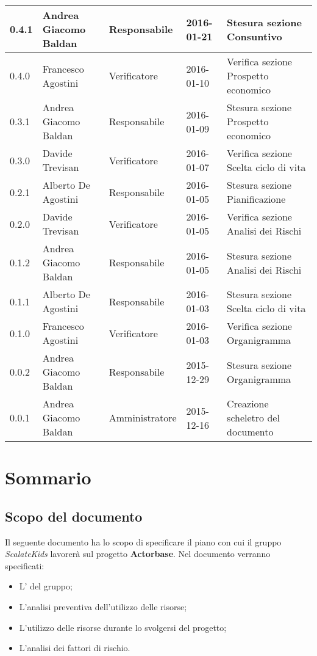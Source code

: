 \documentclass{scalatekids-article}
\begin{document}
\begin{center}
\begin{longtable}{| l | l | l | l | p{5cm} |}
    \hline
    0.4.1 & Andrea Giacomo Baldan & Responsabile & 2016-01-21 & Stesura sezione Consuntivo\\
    \hline
    0.4.0 & Francesco Agostini & Verificatore & 2016-01-10 & Verifica sezione Prospetto economico\\
    \hline
    0.3.1 & Andrea Giacomo Baldan & Responsabile & 2016-01-09 & Stesura sezione Prospetto economico\\
    \hline
    0.3.0 & Davide Trevisan & Verificatore & 2016-01-07 & Verifica sezione Scelta ciclo di vita\\
    \hline
    0.2.1 & Alberto De Agostini & Responsabile & 2016-01-05 & Stesura sezione Pianificazione\\
    \hline
    0.2.0 & Davide Trevisan & Verificatore & 2016-01-05 & Verifica sezione Analisi dei Rischi\\
    \hline
    0.1.2 & Andrea Giacomo Baldan & Responsabile & 2016-01-05 & Stesura sezione Analisi dei Rischi\\
    \hline
    0.1.1 & Alberto De Agostini & Responsabile & 2016-01-03 & Stesura sezione Scelta ciclo di vita\\
    \hline
    0.1.0 & Francesco Agostini & Verificatore & 2016-01-03 & Verifica sezione Organigramma\\
    \hline
    0.0.2 & Andrea Giacomo Baldan & Responsabile & 2015-12-29 & Stesura sezione Organigramma\\
    \hline
    0.0.1 & Andrea Giacomo Baldan & Amministratore & 2015-12-16 & Creazione scheletro del documento\\
    \hline
  \end{longtable}
\end{center}
\tableofcontents
\newpage
{}
\section{Sommario}
\subsection{Scopo del documento}
Il seguente documento ha lo scopo di specificare il piano con cui il gruppo \textit{ScalateKids} lavorerà sul progetto \textbf{Actorbase}.
Nel documento verranno specificati:
\begin{itemize}
\item {L' del gruppo;}
\item {L'analisi preventiva dell'utilizzo delle risorse;}
\item {L'utilizzo delle risorse durante lo svolgersi del progetto;}
\item {L'analisi dei fattori di rischio.}
\end{itemize}
\prodPurpose
\glossExpl
\end{document}
